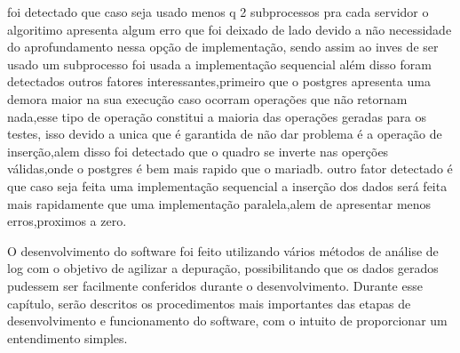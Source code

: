 \documentclass[
	12pt,				%
	openright,			%
	oneside,			%
	a4paper,			%
	english,			%
	french,				%
	spanish,			%
	brazil,				%
	]{abntex2}
\begin{document}
foi detectado que caso seja usado menos q 2 subprocessos pra cada servidor o algoritimo apresenta algum erro que foi deixado de lado devido a não necessidade do aprofundamento nessa opção de implementação,
sendo assim ao inves de ser usado um subprocesso foi usada a implementação sequencial
além disso foram detectados outros fatores interessantes,primeiro que o postgres apresenta uma demora maior na sua execução caso ocorram operações que não retornam nada,esse tipo de operação constitui a maioria das operações geradas para os testes,
isso devido a unica que é garantida de não dar problema é a operação de inserção,alem disso foi detectado que o quadro se inverte nas operções válidas,onde o postgres é bem mais rapido que o mariadb.
outro fator detectado é que caso seja feita uma implementação sequencial a inserção dos dados será feita mais rapidamente que uma implementação paralela,alem de apresentar menos erros,proximos a zero.




O desenvolvimento do software foi feito utilizando vários métodos de análise de log com o objetivo de agilizar a depuração,
possibilitando que os dados gerados pudessem ser facilmente conferidos durante o desenvolvimento.\newline
Durante esse capítulo, serão descritos os procedimentos mais importantes das etapas de desenvolvimento e funcionamento do software, com o intuito de proporcionar um entendimento simples.\newline
\end{document}
